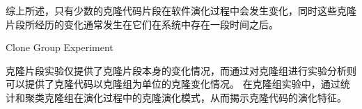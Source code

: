 
综上所述，只有少数的克隆代码片段在软件演化过程中会发生变化，同时这些克隆片段所经历的变化通常发生在它们在系统中存在一段时间之后。

{Clone Group Experiment} 

{克隆片段}实验仅提供了克隆片段本身的变化情况，而通过对{克隆组}进行实验分析则可以提供了克隆代码以克隆组为单位的克隆变化情况。 在克隆组实验中，通过统计和聚类克隆组在演化过程中的克隆演化模式，从而揭示克隆代码的演化特征。

